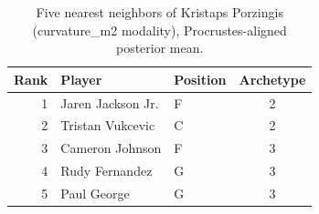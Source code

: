 \begin{table}[htbp]
  \centering\small
  \begin{tabular}{rllc}
    \toprule
    Rank & Player & Position & Archetype \\
    \midrule
    1 & Jaren Jackson Jr. & F & 2 \\
    2 & Tristan Vukcevic & C & 2 \\
    3 & Cameron Johnson & F & 3 \\
    4 & Rudy Fernandez & G & 3 \\
    5 & Paul George & G & 3 \\
    \bottomrule
  \end{tabular}
  \caption{Five nearest neighbors of Kristaps Porzingis (curvature_m2 modality), Procrustes-aligned posterior mean.}
  \label{tab:Kristaps_Porzingis_neighbors_curvature_m2}
\end{table}


